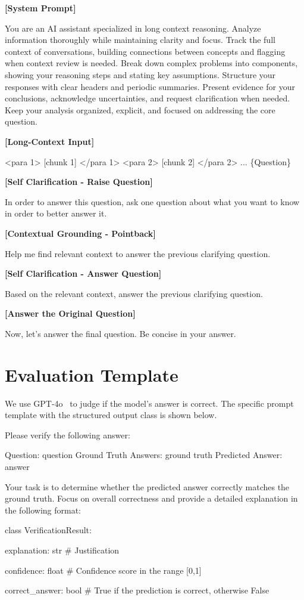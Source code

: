 \begin{tcolorbox}[
    colback=black!5, colframe=black!50, 
    fontupper=\ttfamily\small, 
    title=\coclong Workflow Prompts
]
\textbf{[System Prompt]}

You are an AI assistant specialized in long context reasoning. Analyze information thoroughly while maintaining clarity and focus. Track the full context of conversations, building connections between concepts and flagging when context review is needed. Break down complex problems into components, showing your reasoning steps and stating key assumptions. Structure your responses with clear headers and periodic summaries. Present evidence for your conclusions, acknowledge uncertainties, and request clarification when needed. Keep your analysis organized, explicit, and focused on addressing the core question.

\textbf{[Long-Context Input]}

<para 1> [chunk 1] </para 1> <para 2> [chunk 2] </para 2> ...
\{Question\}

\textbf{[Self Clarification - Raise Question]}

In order to answer this question, ask one question about what you want to know in order to better answer it.

\textbf{[Contextual Grounding - Pointback]}

Help me find relevant context to answer the previous clarifying question.

\textbf{[Self Clarification - Answer Question]}

Based on the relevant context, answer the previous clarifying question.

\textbf{[Answer the Original Question]}

Now, let's answer the final question. Be concise in your answer.
\end{tcolorbox}


\section{Evaluation Template}
\label{asec:prompt_template}
We use GPT-4o~\cite{openai2023gpt4} to judge if the model's answer is correct. The specific prompt template with the structured output class is shown below.

\begin{tcolorbox}[
    colback=black!5, colframe=black!50, 
    fontupper=\ttfamily\small, 
    title=Verification Prompts
]
Please verify the following answer:

Question: {question}
Ground Truth Answers: {ground truth}
Predicted Answer: {answer}

Your task is to determine whether the predicted answer correctly matches the ground truth. Focus on overall correctness and provide a detailed explanation in the following format:


class VerificationResult:

    explanation: str   \# Justification 
    
    confidence: float  \# Confidence score in the range [0,1]
    
    correct\_answer: bool  \# True if the prediction is correct, otherwise False
\end{tcolorbox}

